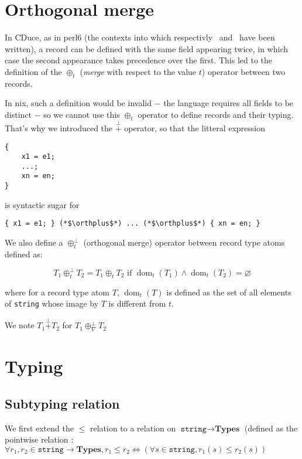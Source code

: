 \documentclass{article}
\renewcommand{\|}{\textrm{|}}
\newcommand{\ty}[1]{\texttt{#1}}
\newcommand{\undef}{\nabla}
\DeclareMathOperator\dom{dom}
\newcommand{\orthsum}{\oplus^\bot}
\newcommand{\orthplus}{\overset{\bot}{+}}
\newcommand{\subtype}{\leq}
\newcommand{\Γ}{\Gamma}
\newcommand{\τ}{\tau}
\newcommand{\σ}{\sigma}
\begin{document}
\section{Orthogonal merge}

In CDuce, as in perl6 (the contexts into which respectivly~\cite{Fri04}
and~\cite{Cas15} have been written), a record can be defined with the same field
appearing twice, in which case the second appearance takes precedence over the
first. This led to the definition of the $\oplus_t$ (\emph{merge} with
respect to the value $t$) operator between two records.

In nix, such a definition would be invalid − the language requires all
fields to be distinct − so we cannot use this $\oplus_t$ operator to
define records and their typing. That's why we introduced the $\orthplus$
operator, so that the litteral expression

\begin{lstlisting}
{
    x1 = e1;
    ...;
    xn = en;
}
\end{lstlisting}

is syntactic sugar for

\begin{lstlisting}
{ x1 = e1; } (*$\orthplus$*) ... (*$\orthplus$*) { xn = en; }
\end{lstlisting}

We also define a $\orthsum_t$ (orthogonal merge) operator between record type
atoms defined as:

\[
  T_1 \orthsum_t T_2 = T_1 \oplus_t T_2
  \text{ if } \dom_t(T_1) \wedge \dom_t(T_2) = \varnothing
\]

where for a record type atom $T$, $\dom_t(T)$ is defined as the set
of all elements of \ty{string} whose image by $T$ is different from $t$.

We note $T_1 \orthplus T_2$ for $T_1 \orthsum_\undef T_2$

\section{Typing}
\subsection{Subtyping relation}

We first extend the $\subtype$ relation to a relation on $\ty{string}
\rightarrow \textbf{Types}$ (defined as the pointwise relation : $\forall r_1,
r_2 \in \ty{string} \rightarrow \textbf{Types}, r_1 \subtype r_2
\Leftrightarrow \left( \forall s \in \ty{string}, r_1(s) \subtype r_2(s)
\right)$
\end{document}
